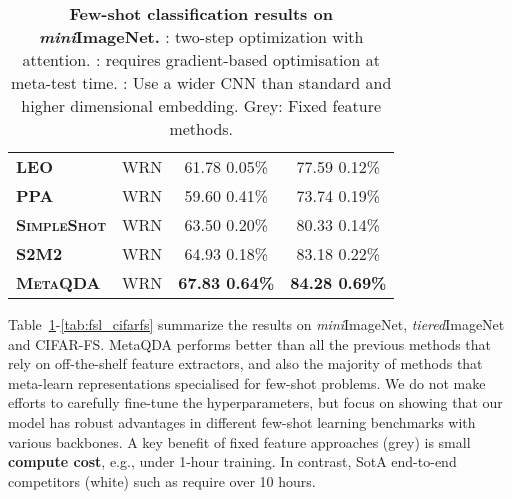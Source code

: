 \documentclass[10pt,twocolumn,letterpaper]{article}
\def\tierIN{\textit{tiered}ImageNet}
\def\miniIN{\textit{mini}ImageNet}
\begin{document}
\begin{table}[h]
{\begin{tabular}{@{} llcc @{}}
\midrule 

\textbf{\textsc{LEO}} \cite{rusu2019leo} & WRN & 61.78  0.05\% & 77.59  0.12\% \\
\rowcolor{Gray} \textbf{\textsc{PPA}} \cite{qiao2017few} & WRN & 59.60  0.41\% & 73.74  0.19\% \\ 
\rowcolor{Gray} \textbf{\textsc{SimpleShot}}\cite{wang2019simpleshot} & WRN & {63.50  0.20\%} & {80.33  0.14\%} \\
\rowcolor{Gray} \textbf{\textsc{S2M2}} \cite{mangla2020charting} & WRN & 64.93  0.18\% & 83.18  0.22\% \\
\rowcolor{Gray} \textbf{\textsc{MetaQDA}} & WRN & \textbf{67.83  0.64\%} & \textbf{84.28  0.69\%} \\ 

\bottomrule
\end{tabular}
}
\caption{\small \small
\textbf{Few-shot classification results on \miniIN{}.} 
: two-step optimization with  attention. 
: requires gradient-based optimisation at meta-test time. : Use a wider CNN than standard and higher dimensional embedding. 
Grey: Fixed feature methods.}
\label{tab:fsl_mini}
\end{table}


Table~\ref{tab:fsl_mini}-\ref{tab:fsl_cifarfs} summarize the results on \miniIN{}, \tierIN{} and CIFAR-FS. MetaQDA performs better than all the previous methods that rely on off-the-shelf feature extractors, and also the majority of methods that meta-learn representations specialised for few-shot problems. We do not make efforts to carefully fine-tune the hyperparameters, but focus on showing that our model has robust advantages in different few-shot learning benchmarks with various backbones. A key benefit of fixed feature approaches (grey) is small \textbf{compute cost}, e.g., under 1-hour training. In contrast, SotA end-to-end competitors (white) such as \cite{lee2019meta,gidaris2018dynamic,xueting2020dcn} require over 10 hours.
\end{document}
